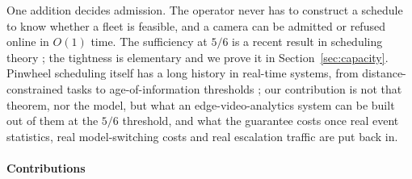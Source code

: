 \documentclass[final,5p,times,twocolumn]{elsarticle}
\theoremstyle{definition}
\begin{document}
\noindent
One addition decides admission. The operator never has to construct a schedule to know whether a
fleet is feasible, and a camera can be admitted or refused online in $O(1)$ time. The
sufficiency at $5/6$ is a recent result in scheduling theory \cite{kawamura2024stoc,kawamura2026pnas};
the tightness is elementary and we prove it in Section~\ref{sec:capacity}. Pinwheel scheduling
itself has a long history in real-time systems, from distance-constrained tasks
\cite{han1996distance} to age-of-information thresholds \cite{li2020aoi}; our contribution is
not that theorem, nor the model, but what an edge-video-analytics system can be built out of
them at the $5/6$ threshold, and what the guarantee costs once real event statistics, real
model-switching costs and real escalation traffic are put back in.

\paragraph{Contributions}
\end{document}
